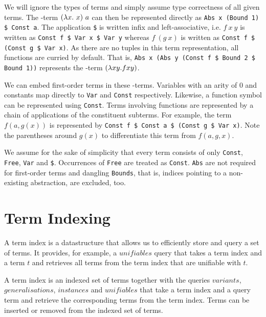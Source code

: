 We will ignore the types of terms and simply assume type correctness of all given terms. The \lam -term $(\lam x.\ x)\ a$ can then be represented directly as \lstinline{Abs x (Bound 1) $ Const a}. The application \lstinline{$} is written infix and left-associative, i.e. $f\ x\ y$ is written as \lstinline{Const f $ Var x $ Var y} whereas $f\ (g\ x)$ is written as \lstinline{Const f $ (Const g $ Var x)}. As there are no tuples in this term representation, all functions are curried by default. That is, \lstinline{Abs x (Abs y (Const f $ Bound 2 $ Bound 1))} represents the \lam -term $(\lambda x y. f x y)$.

We can embed first-order terms in these \lam -terms. Variables with an arity of $0$ and constants map directly to \lstinline{Var} and \lstinline{Const} respectively. Likewise, a function symbol can be represented using \lstinline{Const}. Terms involving functions are represented by a chain of applications of the constituent subterms. For example, the term $f(a,g(x))$ is represented by \lstinline{Const f $ Const a $ (Const g $ Var x)}. Note the parentheses around $g(x)$ to differentiate this term from $f(a,g,x)$.

We assume for the sake of simplicity that every term consists of only \lstinline{Const}, \lstinline{Free}, \lstinline{Var} and \lstinline{$}. Occurrences of \lstinline{Free} are treated as \lstinline{Const}. \lstinline{Abs} are not required for first-order terms and dangling \lstinline{Bounds}, that is, indices pointing to a non-existing abstraction, are excluded, too.

\section{Term Indexing}
  A term index is a datastructure that allows us to efficiently store and query a set of terms. It provides, for example, a $unifiables$ query that takes a term index and a term $t$ and retrieves all terms from the term index that are unifiable with $t$.
\begin{defn}
  A term index is an indexed set of terms together with the queries $variants$, $generalisations$, $instances$ and $unifiables$ that take a term index and a query term and retrieve the corresponding terms from the term index. Terms can be inserted or removed from the indexed set of terms.
\end{defn}



